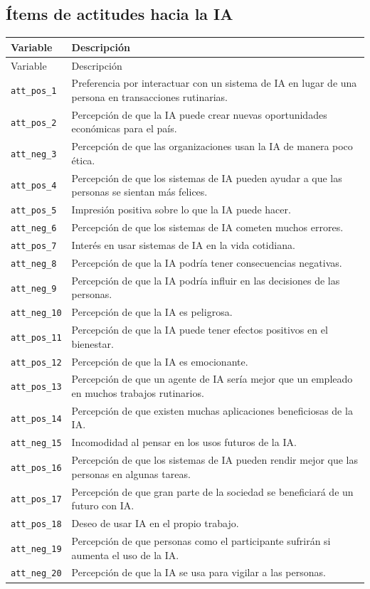 \documentclass[11pt,a4paper]{article}
\begin{document}
\subsection{Ítems de actitudes hacia la IA}

\begin{longtable}{p{}p{}}
\toprule
Variable & Descripción \\
\midrule
\endfirsthead
\toprule
Variable & Descripción \\
\midrule
\endhead
\texttt{att\_pos\_1} & Preferencia por interactuar con un sistema de IA en lugar de una persona en transacciones rutinarias. \\
\texttt{att\_pos\_2} & Percepción de que la IA puede crear nuevas oportunidades económicas para el país. \\
\texttt{att\_neg\_3} & Percepción de que las organizaciones usan la IA de manera poco ética. \\
\texttt{att\_pos\_4} & Percepción de que los sistemas de IA pueden ayudar a que las personas se sientan más felices. \\
\texttt{att\_pos\_5} & Impresión positiva sobre lo que la IA puede hacer. \\
\texttt{att\_neg\_6} & Percepción de que los sistemas de IA cometen muchos errores. \\
\texttt{att\_pos\_7} & Interés en usar sistemas de IA en la vida cotidiana. \\
\texttt{att\_neg\_8} & Percepción de que la IA podría tener consecuencias negativas. \\
\texttt{att\_neg\_9} & Percepción de que la IA podría influir en las decisiones de las personas. \\
\texttt{att\_neg\_10} & Percepción de que la IA es peligrosa. \\
\texttt{att\_pos\_11} & Percepción de que la IA puede tener efectos positivos en el bienestar. \\
\texttt{att\_pos\_12} & Percepción de que la IA es emocionante. \\
\texttt{att\_pos\_13} & Percepción de que un agente de IA sería mejor que un empleado en muchos trabajos rutinarios. \\
\texttt{att\_pos\_14} & Percepción de que existen muchas aplicaciones beneficiosas de la IA. \\
\texttt{att\_neg\_15} & Incomodidad al pensar en los usos futuros de la IA. \\
\texttt{att\_pos\_16} & Percepción de que los sistemas de IA pueden rendir mejor que las personas en algunas tareas. \\
\texttt{att\_pos\_17} & Percepción de que gran parte de la sociedad se beneficiará de un futuro con IA. \\
\texttt{att\_pos\_18} & Deseo de usar IA en el propio trabajo. \\
\texttt{att\_neg\_19} & Percepción de que personas como el participante sufrirán si aumenta el uso de la IA. \\
\texttt{att\_neg\_20} & Percepción de que la IA se usa para vigilar a las personas. \\
\bottomrule
\end{longtable}
\end{document}
